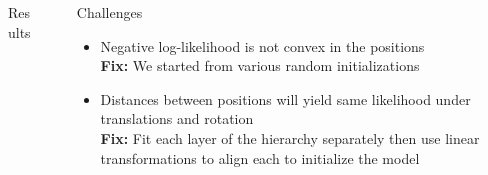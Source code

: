 \documentclass[final]{beamer}
\newlength{\sepwid}
\newlength{\onecolwid}
\newlength{\twocolwid}
\begin{document}
\begin{frame}[t]
\begin{columns}[t]
\begin{column}{\twocolwid}
\begin{columns}[t,totalwidth=\twocolwid]
\begin{column}{\onecolwid}
\begin{block}{Results}


\end{block}


\end{column} %

\end{columns} %

\end{column} %

\begin{column}{\sepwid}\end{column} %

\begin{column}{\onecolwid} %

  \begin{block}{Challenges}

    \begin{itemize}
    \item Negative log-likelihood is not convex in the positions\\
      \textbf{Fix:} We started from various random initializations
    \item Distances between positions will yield same likelihood under
      translations and rotation\\
      \textbf{Fix:} Fit each layer of the hierarchy separately then
      use linear transformations to align each to initialize the model
    \end{itemize}


\end{block}
\end{column}
\end{columns}
\end{frame}
\end{document}
